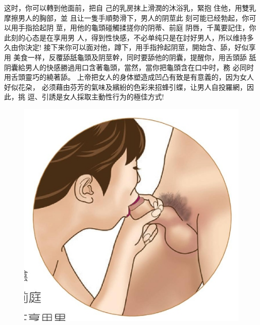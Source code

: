 \documentclass[12pt,UTF8]{ctexbook}
\begin{document}
这时，你可以轉到他面前，把自
己的乳房抹上滑潤的沐浴乳，緊抱
住他，用雙乳摩擦男人的胸部，並
且让一隻手順勢滑下，男人的阴莖此
刻可能已经勃起，你可以用手指拾起阴
莖，用他的龜頭碰觸揉搓你的阴蒂、前庭
阴唇，千萬要記住，你此刻的心态是在享用男
人，得到性快感，不必单纯只是在討好男人，所以维持多久由你決定!
接下来你可以面对他，蹲下，用手指拎起阴莖，開始含、舔，好似享用
美食一样，反覆舔舐龜頭及阴莖幹，同时要舔他的阴囊，提醒你，用舌頭舔
舐阴囊給男人的快感勝過用口含著龜頭，當然，當你把龜頭含在口中时，務
必同时用舌頭靈巧的繞著舔。
上帝把女人的身体塑造成凹凸有致是有意義的，因为女人好似花朶，
必须藉由芬芳的氣味及繽紛的色彩来招蜂引蝶，让男人自投羅網，因此，挑
逗、引誘是女人採取主動性行为的極佳方式!

\begin{figure}[htbp]
	\centering
	\includegraphics[width=0.7\linewidth]{15}
	\caption{}
	\label{fig:1}
\end{figure}
\end{document}
